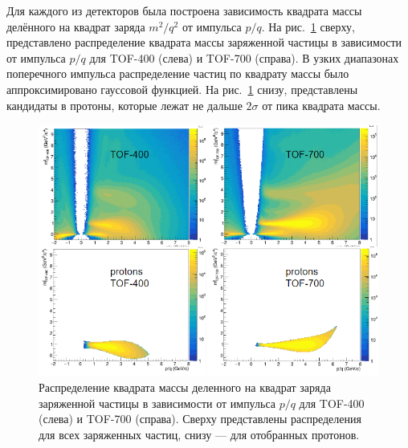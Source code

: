 Для каждого из детекторов была построена зависимость квадрата массы делённого на квадрат заряда $m^2/q^2$ от импульса $p/q$. 
На рис.~\ref{fig:bmn_m2_pq} сверху, представлено распределение квадрата массы заряженной частицы в зависимости от импульса $p/q$ для TOF-400 (слева) и TOF-700 (справа).
В узких диапазонах поперечного импульса распределение частиц по квадрату массы было аппроксимировано гауссовой функцией. 
На рис.~\ref{fig:bmn_m2_pq} снизу, представлены кандидаты в протоны, которые лежат не дальше $2\sigma$ от пика квадрата массы.
%
\begin{figure}[ht]
\begin{center}
\includegraphics[width=0.95\linewidth]{images/bmn_m2_pq.png}
\caption{Распределение квадрата массы деленного на квадрат заряда заряженной частицы в зависимости от импульса $p/q$ для TOF-400 (слева) и TOF-700 (справа). Сверху представлены распределения для всех заряженных частиц, снизу --- для отобранных протонов.}
\label{fig:bmn_m2_pq}
\end{center}
\end{figure}


